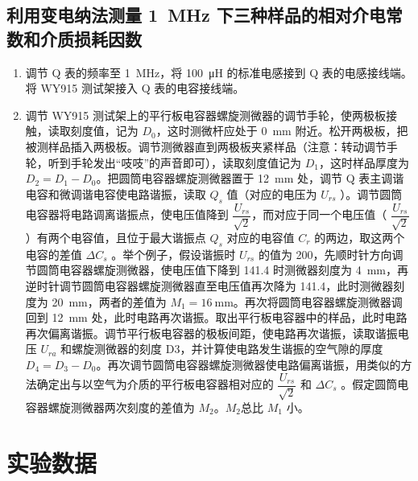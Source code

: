 \documentclass[a4paper,utf8]{article}
\begin{document}
    \subsection{利用变电纳法测量 \SI{1}{\mega\hertz} 下三种样品的相对介电常数和介质损耗因数}
        \begin{enumerate}
            \item 调节 Q 表的频率至 \SI{1}{\mega\hertz}，将 \SI{100}{\micro\henry} 的标准电感接到 Q 表的电感接线端。将 WY915 测试架接入 Q 表的电容接线端。
            \item 调节 WY915 测试架上的平行板电容器螺旋测微器的调节手轮，使两极板接触，读取刻度值，记为 $D_0$，这时测微杆应处于 \SI{0}{\milli\metre} 附近。松开两极板，把被测样品插入两极板。调节测微器直到两极板夹紧样品（注意：转动调节手轮，听到手轮发出“吱吱”的声音即可），读取刻度值记为 $D_1$，这时样品厚度为 $D_2 = D_1 - D_0$。把圆筒电容器螺旋测微器置于 \SI{12}{\milli\metre} 处，调节 Q 表主调谐电容和微调谐电容使电路谐振，读取 $Q_s$ 值（对应的电压为 $U_{rs}$ ）。调节圆筒电容器将电路调离谐振点，使电压值降到 $\dfrac{U_{rs}}{\sqrt{2}}$，而对应于同一个电压值（ $\dfrac{U_{rs}}{\sqrt{2}}$ ）有两个电容值，且位于最大谐振点 $Q_s$ 对应的电容值 $C_r$ 的两边，取这两个电容的差值 $\varDelta C_s$ 。举个例子，假设谐振时 $U_{rs}$ 的值为 200，先顺时针方向调节圆筒电容器螺旋测微器，使电压值下降到 141.4 时测微器刻度为 \SI{4}{\milli\metre}，再逆时针调节圆筒电容器螺旋测微器直至电压值再次降为 141.4，此时测微器刻度为 \SI{20}{\milli\metre}，两者的差值为 $M_1=\SI{16}{\milli\metre}$。再次将圆筒电容器螺旋测微器调回到 \SI{12}{\milli\metre} 处，此时电路再次谐振。取出平行板电容器中的样品，此时电路再次偏离谐振。调节平行板电容器的极板间距，使电路再次谐振，读取谐振电压 $U_{ra}$ 和螺旋测微器的刻度 D3，并计算使电路发生谐振的空气隙的厚度 $D_4=D_3-D_0$。再次调节圆筒电容器螺旋测微器使电路偏离谐振，用类似的方法确定出与以空气为介质的平行板电容器相对应的 $\dfrac{U_{rs}}{\sqrt{2}}$ 和 $\varDelta C_s$ 。假定圆筒电容器螺旋测微器两次刻度的差值为 $M_2$。$M_2$总比 $M_1$ 小。
        \end{enumerate}
\section{实验数据}
\end{document}
